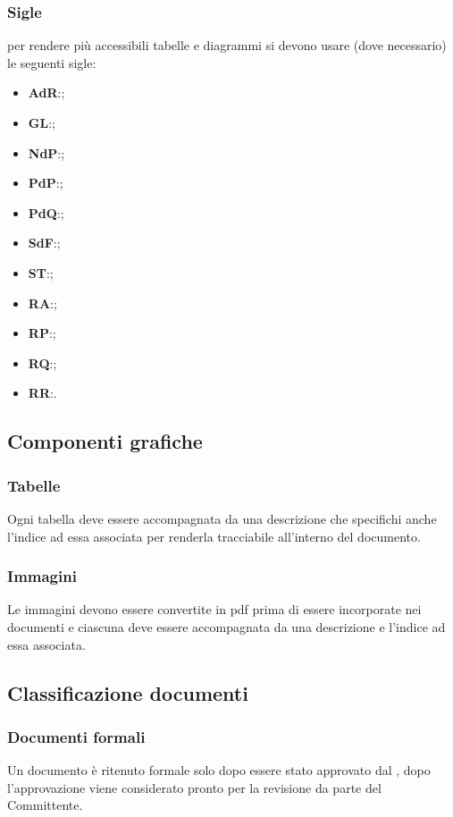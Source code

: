 \documentclass[../NormeDiProgetto.tex]{subfiles}
\begin{document}
		\subsubsection{Sigle}
		per rendere più accessibili tabelle e diagrammi si devono usare (dove 
		necessario) le seguenti sigle:
		\begin{itemize}
			\item \textbf{AdR}:\analisideirequisiti ;
			\item \textbf{GL}:\glossario ;
			\item \textbf{NdP}:\normediprogetto ;
			\item \textbf{PdP}:\pianodiprogetto ;
			\item \textbf{PdQ}:\pianodiqualifica ;
			\item \textbf{SdF}:\normediprogetto ;
			\item \textbf{ST}:\specificatecnica ;
			\item \textbf{RA}:\revisionediaccettazione ;
			\item \textbf{RP}:\revisionediprogettazione ;
			\item \textbf{RQ}:\revisionediqualifica ;
			\item \textbf{RR}:\revisionedeirequisiti .
		\end{itemize}
		\subsection{Componenti grafiche}
		\subsubsection{Tabelle}
		Ogni tabella deve essere accompagnata da una descrizione che specifichi anche l'indice ad essa associata per renderla tracciabile all'interno del documento.
		\subsubsection{Immagini}
		Le immagini devono essere convertite in pdf prima di essere incorporate nei documenti e ciascuna deve essere accompagnata da una descrizione e l'indice ad essa associata.  
		
		
		\subsection{Classificazione documenti}
		
		\subsubsection{Documenti formali}
		Un documento è ritenuto formale solo dopo essere stato approvato dal \responsabilediprogetto , dopo l'approvazione viene considerato pronto per la revisione da parte del Committente.
\end{document}
